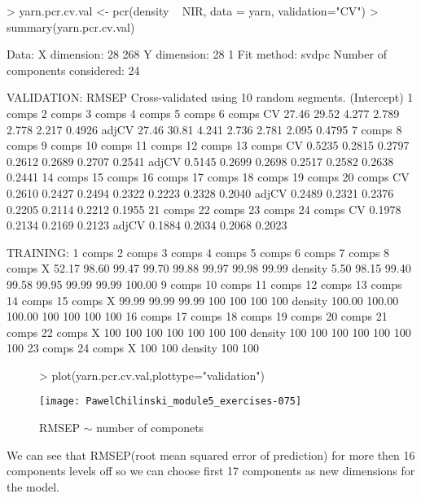 \documentclass[a4paper]{article}
\begin{document}
\begin{itemize}
\begin{Schunk}
\begin{Sinput}
> yarn.pcr.cv.val <- pcr(density ~ NIR, data = yarn, validation="CV")
> summary(yarn.pcr.cv.val)
\end{Sinput}
\begin{Soutput}
Data: 	X dimension: 28 268 
	Y dimension: 28 1
Fit method: svdpc
Number of components considered: 24

VALIDATION: RMSEP
Cross-validated using 10 random segments.
       (Intercept)  1 comps  2 comps  3 comps  4 comps  5 comps  6 comps
CV           27.46    29.52    4.277    2.789    2.778    2.217   0.4926
adjCV        27.46    30.81    4.241    2.736    2.781    2.095   0.4795
       7 comps  8 comps  9 comps  10 comps  11 comps  12 comps  13 comps
CV      0.5235   0.2815   0.2797    0.2612    0.2689    0.2707    0.2541
adjCV   0.5145   0.2699   0.2698    0.2517    0.2582    0.2638    0.2441
       14 comps  15 comps  16 comps  17 comps  18 comps  19 comps  20 comps
CV       0.2610    0.2427    0.2494    0.2322    0.2223    0.2328    0.2040
adjCV    0.2489    0.2321    0.2376    0.2205    0.2114    0.2212    0.1955
       21 comps  22 comps  23 comps  24 comps
CV       0.1978    0.2134    0.2169    0.2123
adjCV    0.1884    0.2034    0.2068    0.2023

TRAINING: % variance explained
         1 comps  2 comps  3 comps  4 comps  5 comps  6 comps  7 comps  8 comps
X          52.17    98.60    99.47    99.70    99.88    99.97    99.98    99.99
density     5.50    98.15    99.40    99.58    99.95    99.99    99.99   100.00
         9 comps  10 comps  11 comps  12 comps  13 comps  14 comps  15 comps
X          99.99     99.99     99.99       100       100       100       100
density   100.00    100.00    100.00       100       100       100       100
         16 comps  17 comps  18 comps  19 comps  20 comps  21 comps  22 comps
X             100       100       100       100       100       100       100
density       100       100       100       100       100       100       100
         23 comps  24 comps
X             100       100
density       100       100
\end{Soutput}
\end{Schunk}

\begin{figure}[H]
\begin{center}
\begin{Schunk}
\begin{Sinput}
> plot(yarn.pcr.cv.val,plottype="validation")
\end{Sinput}
\end{Schunk}
\texttt{[image: PawelChilinski\_module5\_exercises-075]}
\caption{RMSEP $\sim$ number of componets}
\end{center}
\end{figure}
We can see that RMSEP(root mean squared error of prediction) for more then 16
components levels off so we can choose first 17 components as new dimensions for
the model.


\end{itemize}
\end{document}
